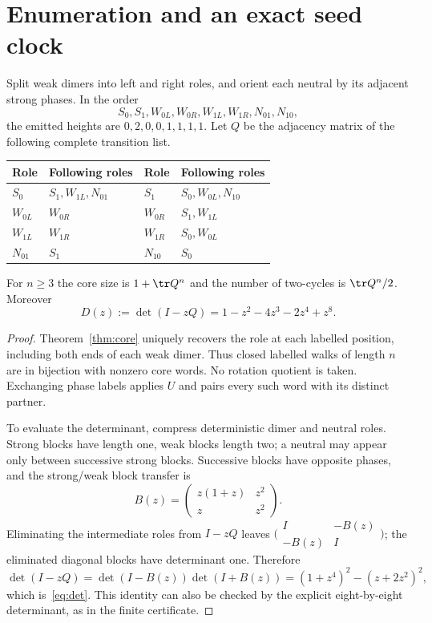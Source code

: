 \section{Enumeration and an exact seed clock}

Split weak dimers into left and right roles, and orient each neutral
by its adjacent strong phases. In the order
\[
 S_0,S_1,W_{0L},W_{0R},W_{1L},W_{1R},N_{01},N_{10},
\]
the emitted heights are $0,2,0,0,1,1,1,1$. Let $Q$ be the adjacency
matrix of the following complete transition list.
\begin{center}
\begin{tabular}{ll@{\qquad}ll}
\toprule
Role & Following roles & Role & Following roles\\
\midrule
$S_0$ & $S_1,W_{1L},N_{01}$ & $S_1$ & $S_0,W_{0L},N_{10}$\\
$W_{0L}$ & $W_{0R}$ & $W_{0R}$ & $S_1,W_{1L}$\\
$W_{1L}$ & $W_{1R}$ & $W_{1R}$ & $S_0,W_{0L}$\\
$N_{01}$ & $S_1$ & $N_{10}$ & $S_0$\\
\bottomrule
\end{tabular}
\end{center}

\begin{proposition}\label{prop:count}
 For $n\ge3$ the core size is $1+\tr Q^n$ and the number of two-cycles
 is $\tr Q^n/2$. Moreover
 \begin{equation}\label{eq:det}
 D(z):=\det(I-zQ)=1-z^2-4z^3-2z^4+z^8.
 \end{equation}
\end{proposition}
\begin{proof}
 Theorem~\ref{thm:core} uniquely recovers the role at each labelled
 position, including both ends of each weak dimer. Thus closed labelled
 walks of length $n$ are in bijection with nonzero core words. No
 rotation quotient is taken. Exchanging phase labels applies $U$ and
 pairs every such word with its distinct partner.

 To evaluate the determinant, compress deterministic dimer and neutral
 roles. Strong blocks have length one, weak blocks length two; a neutral
 may appear only between successive strong blocks. Successive blocks
 have opposite phases, and the strong/weak block transfer is
 \[
 B(z)=\begin{pmatrix}z(1+z)&z^2\\z&z^2\end{pmatrix}.
 \]
 Eliminating the intermediate roles from $I-zQ$ leaves
 $\bigl(\begin{smallmatrix}I&-B(z)\\-B(z)&I\end{smallmatrix}\bigr)$;
 the eliminated diagonal blocks have determinant one. Therefore
 \[
 \det(I-zQ)=\det(I-B(z))\det(I+B(z))
 =(1+z^4)^2-(z+2z^2)^2,
 \]
 which is~\eqref{eq:det}. This identity can also be checked by the
 explicit eight-by-eight determinant, as in the finite certificate.
\end{proof}

